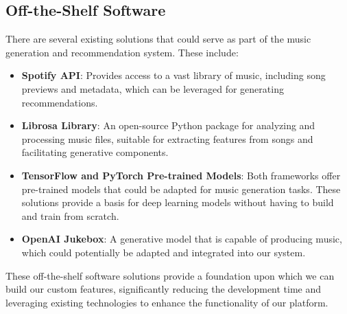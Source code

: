 \documentclass[12pt]{article}
\begin{document}
\subsection{Off-the-Shelf Software}
There are several existing solutions that could serve as part of the music generation and recommendation system. These include:

\begin{itemize}
    \item \textbf{Spotify API}: Provides access to a vast library of music, including song previews and metadata, which can be leveraged for generating recommendations.
    \item \textbf{Librosa Library}: An open-source Python package for analyzing and processing music files, suitable for extracting features from songs and facilitating generative components.
    \item \textbf{TensorFlow and PyTorch Pre-trained Models}: Both frameworks offer pre-trained models that could be adapted for music generation tasks. These solutions provide a basis for deep learning models without having to build and train from scratch.
    \item \textbf{OpenAI Jukebox}: A generative model that is capable of producing music, which could potentially be adapted and integrated into our system.
\end{itemize}

These off-the-shelf software solutions provide a foundation upon which we can build our custom features, significantly reducing the development time and leveraging existing technologies to enhance the functionality of our platform.
\end{document}
